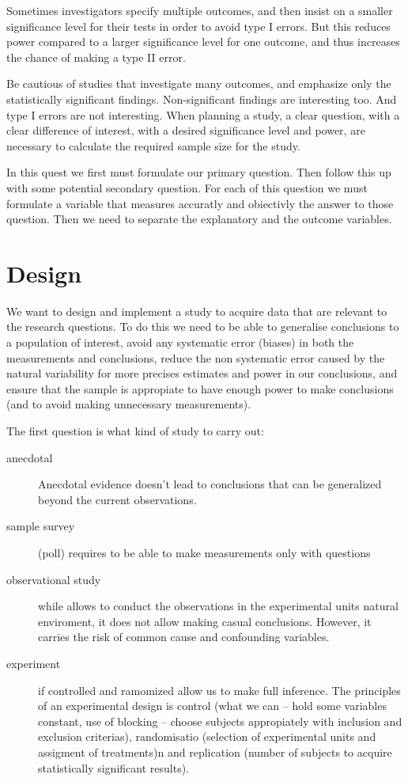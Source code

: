 Sometimes investigators specify multiple outcomes, and then insist on a smaller
significance level for their tests in order to avoid type I errors. But this
reduces power compared to a larger significance level for one outcome, and thus
increases the chance of making a type II error.

Be cautious of studies that investigate many outcomes, and emphasize only the
statistically significant findings. Non-significant findings are interesting
too. And type I errors are not interesting. When planning a study, a clear
question, with a clear difference of interest, with a desired significance level
and power, are necessary to calculate the required sample size for the study.

In this quest we first must formulate our primary question. Then follow this up
with some potential secondary question. For each of this question we must
formulate a variable that measures accuratly and obiectivly the answer to those
question. Then we need to separate the explanatory and the outcome variables.

\section{Design}

We want to design and implement a study to acquire data that are relevant to the
research questions. To do this we need to be able to generalise conclusions to a
population of interest, avoid any systematic error (biases) in both the
measurements and conclusions, reduce the non systematic error caused by the
natural variability for more precises estimates and power in our conclusions,
and ensure that the sample is appropiate to have enough power to make
conclusions (and to avoid making unnecessary measurements).

The first question is what kind of study to carry out:

\begin{description}
	\item[anecdotal] Anecdotal evidence doesn't lead to conclusions that can be
	      generalized beyond the current observations.
	\item[sample survey] (poll) requires to be able to make measurements only with
	      questions
	\item[observational study] while allows to conduct the observations in the
	      experimental units natural enviroment, it does not allow making casual
	      conclusions. However, it carries the risk of common cause and confounding
	      variables.
	\item[experiment] if controlled and ramomized allow us to make full inference.
	      The principles of an experimental design is control (what we can -- hold
	      some variables constant, use of blocking -- choose subjects appropiately
	      with inclusion and exclusion criterias), randomisatio (selection of
	      experimental units and assigment of treatments)n and replication (number of
	      subjects to acquire statistically significant results).
\end{description}

